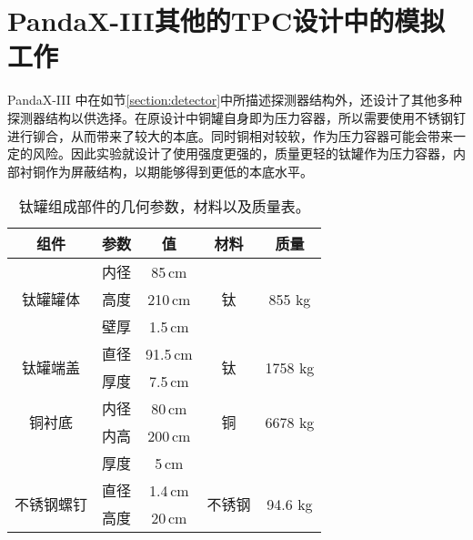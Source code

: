 
\chapter{PandaX-III其他的TPC设计中的模拟工作}

PandaX-III 中在如节\ref{section:detector}中所描述探测器结构外，还设计了其他多种探测器结构以供选择。在原设计中铜罐自身即为压力容器，所以需要使用不锈钢钉进行铆合，从而带来了较大的本底。同时铜相对较软，作为压力容器可能会带来一定的风险。因此实验就设计了使用强度更强的，质量更轻的钛罐作为压力容器，内部衬铜作为屏蔽结构，以期能够得到更低的本底水平。

\renewcommand\arraystretch{1.2}
\begin{table*}[hbt]
    \begin{center}
        \caption{钛罐组成部件的几何参数，材料以及质量表。\supercite{cdr}}
        \begin{tabular*}{0.75\textwidth}{@{\extracolsep{\fill}}ccccc}
        \hline
        \hline
        \textbf{组件}   &   \textbf{参数}   &   \textbf{值} &   \textbf{材料} & \textbf{质量} \\ \hline
        \multirow{3}{*}{钛罐罐体} 
            &   内径&   85\,cm&     \multirow{3}{*}{钛} &   \multirow{3}{*}{855 kg} \\
            &   高度&   210\,cm&    &   \\   
            &   壁厚&   1.5\,cm&    &   \\\hline
        \multirow{2}{*}{钛罐端盖} 
            & 直径 & 91.5\,cm & \multirow{2}{*}{钛} & \multirow{2}{*}{1758 kg} \\
            & 厚度 & 7.5\,cm &  &    \\\hline
        \multirow{2}{*}{铜衬底} 
            & 内径 & 80\,cm & \multirow{2}{*}{铜} & \multirow{2}{*}{6678 kg} \\
            & 内高 & 200\,cm &  &    \\
            & 厚度 & 5\,cm &  & \\\hline
        \multirow{2}{*}{不锈钢螺钉} 
            & 直径 & 1.4\,cm & \multirow{2}{*}{不锈钢} & \multirow{2}{*}{94.6 kg} \\
            & 高度 & 20\,cm &  &    \\
        \hline
        \hline
        \end{tabular*}
        \label{tab:ti_structure}
    \end{center}
\end{table*}

